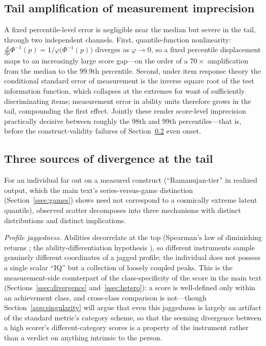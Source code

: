 \documentclass{article}
\begin{document}
\subsection{Tail amplification of measurement imprecision}\label{app:tail}
A fixed percentile-level error is negligible near the median but severe in the tail, through two independent channels. First, quantile-function nonlinearity: $\tfrac{d}{dp}\Phi^{-1}(p)=1/\varphi\!\big(\Phi^{-1}(p)\big)$ diverges as $\varphi\to 0$, so a fixed percentile displacement maps to an increasingly large score gap---on the order of a $70\times$ amplification from the median to the $99.9$th percentile. Second, under item response theory \cite{lord1980} the conditional standard error of measurement is the inverse square root of the test information function, which collapses at the extremes for want of sufficiently discriminating items; measurement error in ability units therefore grows in the tail, compounding the first effect. Jointly these render score-level imprecision practically decisive between roughly the $98$th and $99$th percentiles---that is, before the construct-validity failures of Section~\ref{app:three} even onset.

\subsection{Three sources of divergence at the tail}\label{app:three}
For an individual far out on a measured construct (``Ramanujan-tier'' in realized output, which the main text's series-versus-game distinction (Section~\ref{ssec:games}) shows need not correspond to a cosmically extreme latent quantile), observed scatter decomposes into three mechanisms with distinct distributions and distinct implications.

\emph{Profile jaggedness.} Abilities decorrelate at the top (Spearman's law of diminishing returns \cite{spearman1927}; the ability-differentiation hypothesis \cite{tuckerdrob2009}), so different instruments sample genuinely different coordinates of a jagged profile; the individual does not possess a single scalar ``IQ'' but a collection of loosely coupled peaks. This is the measurement-side counterpart of the class-specificity of the score in the main text (Sections~\ref{ssec:divergence} and~\ref{ssec:hetero}): a score is well-defined only within an achievement class, and cross-class comparison is not---though Section~\ref{app:singularity} will argue that even this jaggedness is largely an artifact of the standard metric's category scheme, so that the seeming divergence between a high scorer's different-category scores is a property of the instrument rather than a verdict on anything intrinsic to the person.
\end{document}

